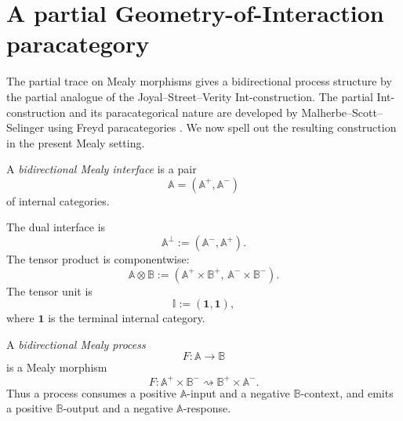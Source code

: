 \section{A partial Geometry-of-Interaction paracategory}
\label{sec:partial-geometry-of-interaction-category}

The partial trace on Mealy morphisms gives a bidirectional process structure
by the partial analogue of the Joyal--Street--Verity Int-construction.  The
partial Int-construction and its paracategorical nature are developed by
Malherbe--Scott--Selinger using Freyd paracategories
\cite{MalherbeScottSelingerPartiallyTracedCategories}.  We now spell out the
resulting construction in the present Mealy setting.

\begin{definition}
\label{def:bidirectional-mealy-interface}
A \emph{bidirectional Mealy interface} is a pair
\[
\mathbb A=(\mathbb A^+,\mathbb A^-)
\]
of internal categories.

The dual interface is
\[
\mathbb A^\bot:=(\mathbb A^-,\mathbb A^+).
\]
The tensor product is componentwise:
\[
\mathbb A\otimes\mathbb B
:=
(\mathbb A^+\times\mathbb B^+,\,
 \mathbb A^-\times\mathbb B^-).
\]
The tensor unit is
\[
\mathbb I:=(\mathbf 1,\mathbf 1),
\]
where \(\mathbf 1\) is the terminal internal category.
\end{definition}

\begin{definition}
\label{def:bidirectional-mealy-process}
A \emph{bidirectional Mealy process}
\[
F:\mathbb A\to\mathbb B
\]
is a Mealy morphism
\[
F:
\mathbb A^+\times\mathbb B^-
\rightsquigarrow
\mathbb B^+\times\mathbb A^-.
\]
Thus a process consumes a positive \(\mathbb A\)-input and a negative
\(\mathbb B\)-context, and emits a positive \(\mathbb B\)-output and a
negative \(\mathbb A\)-response.
\end{definition}

